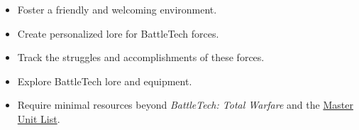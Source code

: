 \begin{itemize}

\item Foster a friendly and welcoming environment.

\item Create personalized lore for BattleTech forces.

\item Track the struggles and accomplishments of these forces.

\item Explore BattleTech lore and equipment.

\item Require minimal resources beyond \emph{BattleTech: Total Warfare} and the \href{http://www.masterunitlist.info}{Master Unit List}.

\end{itemize}
